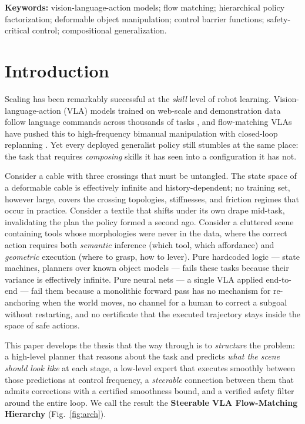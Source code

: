 \documentclass[11pt,a4paper]{article}
\begin{document}
\noindent\textbf{Keywords:} vision-language-action models; flow matching;
hierarchical policy factorization; deformable object manipulation; control
barrier functions; safety-critical control; compositional generalization.

\section{Introduction}
\label{sec:intro}

Scaling has been remarkably successful at the \emph{skill} level of robot
learning. Vision-language-action (VLA) models trained on web-scale and
demonstration data follow language commands across thousands of tasks
\cite{rt2,openvla,octo,oxe}, and flow-matching VLAs have pushed this to
high-frequency bimanual manipulation with closed-loop replanning
\cite{pi0,pi07}. Yet every deployed generalist policy still stumbles at the same
place: the task that requires \emph{composing} skills it has seen into a
configuration it has not.

Consider a cable with three crossings that must be untangled. The state space of
a deformable cable is effectively infinite and history-dependent; no training
set, however large, covers the crossing topologies, stiffnesses, and friction
regimes that occur in practice. Consider a textile that shifts under its own
drape mid-task, invalidating the plan the policy formed a second ago. Consider a
cluttered scene containing tools whose morphologies were never in the data, where
the correct action requires both \emph{semantic} inference (which tool, which
affordance) and \emph{geometric} execution (where to grasp, how to lever).
Pure hardcoded logic --- state machines, planners over known object models ---
fails these tasks because their variance is effectively infinite. Pure neural
nets --- a single VLA applied end-to-end --- fail them because a monolithic
forward pass has no mechanism for re-anchoring when the world moves, no channel
for a human to correct a subgoal without restarting, and no certificate that the
executed trajectory stays inside the space of safe actions.

This paper develops the thesis that the way through is to \emph{structure} the
problem: a high-level planner that reasons about the task and predicts \emph{what
the scene should look like} at each stage, a low-level expert that executes
smoothly between those predictions at control frequency, a \emph{steerable}
connection between them that admits corrections with a certified smoothness
bound, and a verified safety filter around the entire loop. We call the result
the \textbf{Steerable VLA Flow-Matching Hierarchy} (Fig.~\ref{fig:arch}).
\end{document}
